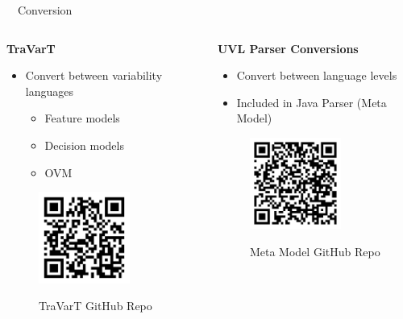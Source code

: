 \documentclass[
	aspectratio=169, %
	8pt, %
	nosectionframes, %
]{beamer}
\newcommand{\inlinesubtitle}[1]{\textcolor{gray!60}{~{}~#1}}
\begin{document}
\begin{frame}{\insertsection \inlinesubtitle{Conversion}}
    	\begin{columns}
		\begin{column}{0.49\textwidth}
			\textbf{TraVarT}
            \begin{itemize}
                \item Convert between variability languages
                \begin{itemize}
                    \item Feature models
                    \item Decision models
                    \item OVM
                \end{itemize}
            \end{itemize}
            \begin{figure}
                \centering
                \includegraphics[width=3cm]{pics/qr/travart.pdf}
                
                TraVarT GitHub Repo
            \end{figure}

		\end{column}

		\begin{column}{0.49\textwidth}
			\textbf{UVL Parser Conversions}
   \begin{itemize}
       \item Convert between language levels
       \item Included in Java Parser (Meta Model)
   \end{itemize}
               \begin{figure}
                \centering
                \includegraphics[width=3cm]{pics/qr/metamodel.pdf}
                
                Meta Model GitHub Repo
            \end{figure}
   
		\end{column}
	\end{columns}
\end{frame}
\end{document}
